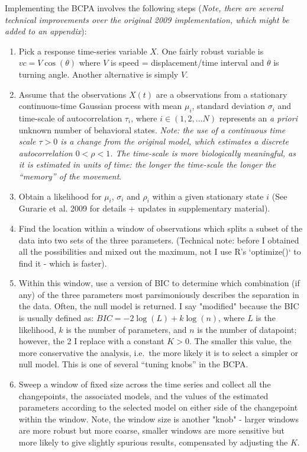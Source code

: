 \documentclass[10pt]{article}\usepackage{graphicx, color}
\newcommand{\ben}{\begin{enumerate}}
\newcommand{\een}{\end{enumerate}}
\newcommand{\I}{\item}
\begin{document}
Implementing the BCPA involves the following steps (\emph{Note, there are several technical improvements over the original 2009 implementation, which might be added to an appendix}):

\ben
\I Pick a response time-series variable $X$.  One fairly robust variable is $vc = V \cos(\theta)$ where $V$ is speed = displacement/time interval and $\theta$ is turning angle.  Another alternative is simply $V$. 

\I Assume that the observations $X(t)$ are a observations from a stationary continuous-time Gaussian process with mean $\mu_i$, standard deviation $\sigma_i$ and time-scale of autocorrelation $\tau_i$, where $i \in (1,2,...N)$ represents an \emph{a priori} unknown number of behavioral states. \emph{Note: the use of a continuous time scale $\tau >0$ is a change from the original model, which estimates a discrete autocorrelation $0 < \rho < 1$.  The time-scale is more biologically meaningful, as it is estimated in units of time: the longer the time-scale the longer the ``memory'' of the movement}.

\I Obtain a likelihood for $\mu_i$, $\sigma_i$ and $\rho_i$ within a given stationary state $i$ (See Gurarie et al. 2009 for details + updates in supplementary material).

\I Find the location within a window of observations which splits a subset of the data into two sets of the three parameters. (Technical note: before I obtained all the possibilities and mixed out the maximum, not I use R's `optimize()` to find it - which is faster).

\I Within this window, use a version of BIC to determine which combination (if any) of the three parameters most parsimoniously describes the separation in the data.  Often, the null model is returned.  I say "modified" because the BIC is usually defined as: $BIC = - 2 \log(L) + k \log(n)$, where $L$ is the likelihood, $k$ is the number of parameters, and $n$ is the number of datapoint; however, the 2 I replace with a constant $K > 0$.  The smaller this value, the more conservative the analysis, i.e.~the more likely it is to select a simpler or null model.  This is one of several ``tuning knobs'' in the BCPA. 

\I Sweep a window of fixed size across the time series and collect all the changepoints, the  associated models, and the values of the estimated parameters according to the selected model on either side of the changepoint within the window.   Note, the window size is another "knob" - larger windows are more robust but more coarse, smaller windows are more sensitive but more likely to give slightly spurious results, compensated by adjusting the $K$.
\een
\end{document}
